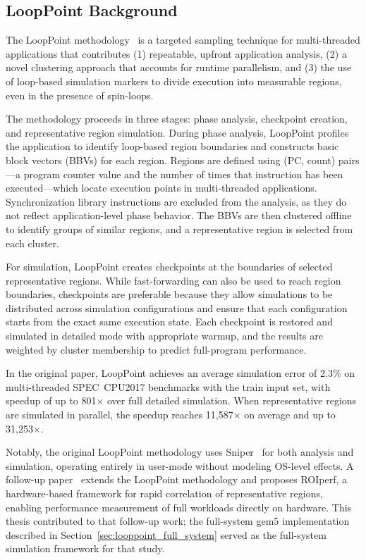 \subsection{LoopPoint Background}\label{sec:looppoint_background}

The LoopPoint methodology~\cite{looppoint} is a targeted sampling technique for multi-threaded applications that contributes (1) repeatable, upfront application analysis, (2) a novel clustering approach that accounts for runtime parallelism, and (3) the use of loop-based simulation markers to divide execution into measurable regions, even in the presence of spin-loops.

The methodology proceeds in three stages: phase analysis, checkpoint creation, and representative region simulation.
During phase analysis, LoopPoint profiles the application to identify loop-based region boundaries and constructs basic block vectors (BBVs) for each region.
Regions are defined using (PC, count) pairs---a program counter value and the number of times that instruction has been executed---which locate execution points in multi-threaded applications.
Synchronization library instructions are excluded from the analysis, as they do not reflect application-level phase behavior.
The BBVs are then clustered offline to identify groups of similar regions, and a representative region is selected from each cluster.

For simulation, LoopPoint creates checkpoints at the boundaries of selected representative regions.
While fast-forwarding can also be used to reach region boundaries, checkpoints are preferable because they allow simulations to be distributed across simulation configurations and ensure that each configuration starts from the exact same execution state.
Each checkpoint is restored and simulated in detailed mode with appropriate warmup, and the results are weighted by cluster membership to predict full-program performance.

In the original paper, LoopPoint achieves an average simulation error of 2.3\% on multi-threaded SPEC~CPU2017 benchmarks with the train input set, with speedup of up to 801$\times$ over full detailed simulation.
When representative regions are simulated in parallel, the speedup reaches 11,587$\times$ on average and up to 31,253$\times$.

Notably, the original LoopPoint methodology uses Sniper~\cite{sniper} for both analysis and simulation, operating entirely in user-mode without modeling OS-level effects.
A follow-up paper~\cite{roiref} extends the LoopPoint methodology and proposes ROIperf, a hardware-based framework for rapid correlation of representative regions, enabling performance measurement of full workloads directly on hardware.
This thesis contributed to that follow-up work; the full-system gem5 implementation described in Section~\ref{sec:looppoint_full_system} served as the full-system simulation framework for that study.
